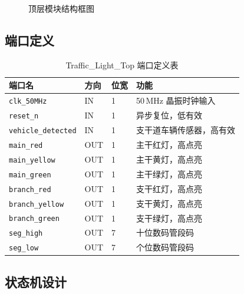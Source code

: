 \documentclass[12pt,a4paper]{ctexart}
\begin{document}
\begin{figure}[H]
\caption{顶层模块结构框图}
\label{fig:block}
\end{figure}

\subsection{端口定义}

\begin{table}[H]
\centering
\caption{Traffic\_Light\_Top 端口定义表}
\label{tab:ports}
\begin{tabular}{@{}llp{1.3cm}p{5.5cm}@{}}
\toprule
\textbf{端口名}      & \textbf{方向} & \textbf{位宽} & \textbf{功能} \\ \midrule
\texttt{clk\_50MHz}        & IN  & 1  & 50\,MHz 晶振时钟输入 \\
\texttt{reset\_n}          & IN  & 1  & 异步复位，低有效 \\
\texttt{vehicle\_detected} & IN  & 1  & 支干道车辆传感器，高有效 \\
\texttt{main\_red}         & OUT & 1  & 主干红灯，高点亮 \\
\texttt{main\_yellow}      & OUT & 1  & 主干黄灯，高点亮 \\
\texttt{main\_green}       & OUT & 1  & 主干绿灯，高点亮 \\
\texttt{branch\_red}       & OUT & 1  & 支干红灯，高点亮 \\
\texttt{branch\_yellow}    & OUT & 1  & 支干黄灯，高点亮 \\
\texttt{branch\_green}     & OUT & 1  & 支干绿灯，高点亮 \\
\texttt{seg\_high}         & OUT & 7  & 十位数码管段码 \\
\texttt{seg\_low}          & OUT & 7  & 个位数码管段码 \\ \bottomrule
\end{tabular}
\end{table}

\subsection{状态机设计}
\end{document}
